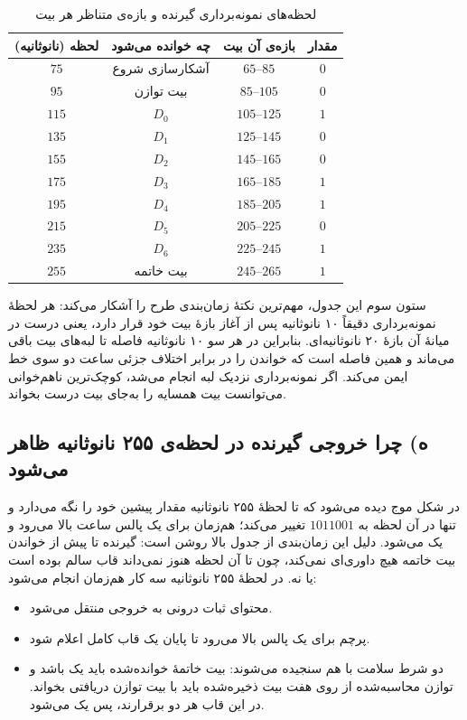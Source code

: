\documentclass[12pt,a4paper]{article}
\begin{document}
	\begin{table}[H]
		\centering
		\footnotesize
		\begin{tabular}{|c|c|c|c|}
			\hline
			\textbf{لحظه (نانوثانیه)} & \textbf{چه خوانده می‌شود} & \textbf{بازه‌ی آن بیت} & \textbf{مقدار} \\ \hline
			\(75\)  & آشکارسازی شروع & \(65\)--\(85\)   & \(0\) \\ \hline
			\(95\)  & بیت توازن      & \(85\)--\(105\)  & \(0\) \\ \hline
			\(115\) & \(D_0\)        & \(105\)--\(125\) & \(1\) \\ \hline
			\(135\) & \(D_1\)        & \(125\)--\(145\) & \(0\) \\ \hline
			\(155\) & \(D_2\)        & \(145\)--\(165\) & \(0\) \\ \hline
			\(175\) & \(D_3\)        & \(165\)--\(185\) & \(1\) \\ \hline
			\(195\) & \(D_4\)        & \(185\)--\(205\) & \(1\) \\ \hline
			\(215\) & \(D_5\)        & \(205\)--\(225\) & \(0\) \\ \hline
			\(235\) & \(D_6\)        & \(225\)--\(245\) & \(1\) \\ \hline
			\(255\) & بیت خاتمه      & \(245\)--\(265\) & \(1\) \\ \hline
		\end{tabular}
		\caption{لحظه‌های نمونه‌برداری گیرنده و بازه‌ی متناظر هر بیت}
	\end{table}

	ستون سوم این جدول، مهم‌ترین نکتهٔ زمان‌بندی طرح را آشکار می‌کند: هر لحظهٔ نمونه‌برداری دقیقاً ۱۰ نانوثانیه پس از آغاز بازهٔ بیت خود قرار دارد، یعنی درست در میانهٔ آن بازهٔ ۲۰ نانوثانیه‌ای. بنابراین در هر سو ۱۰ نانوثانیه فاصله تا لبه‌های بیت باقی می‌ماند و همین فاصله است که خواندن را در برابر اختلاف جزئی ساعت دو سوی خط ایمن می‌کند. اگر نمونه‌برداری نزدیک لبه انجام می‌شد، کوچک‌ترین ناهم‌خوانی می‌توانست بیت همسایه را به‌جای بیت درست بخواند.

	\subsection*{ه) چرا خروجی گیرنده در لحظه‌ی ۲۵۵ نانوثانیه ظاهر می‌شود}
	در شکل موج دیده می‌شود که  تا لحظهٔ ۲۵۵ نانوثانیه مقدار پیشین خود را نگه می‌دارد و تنها در آن لحظه به \(1011001\) تغییر می‌کند؛ هم‌زمان  برای یک پالس ساعت بالا می‌رود و  یک می‌شود. دلیل این زمان‌بندی از جدول بالا روشن است: گیرنده تا پیش از خواندن بیت خاتمه هیچ داوری‌ای نمی‌کند، چون تا آن لحظه هنوز نمی‌داند قاب سالم بوده است یا نه. در لحظهٔ ۲۵۵ نانوثانیه سه کار هم‌زمان انجام می‌شود:
	\begin{itemize}
		\item محتوای ثبات درونی به خروجی  منتقل می‌شود.
		\item پرچم  برای یک پالس بالا می‌رود تا پایان یک قاب کامل اعلام شود.
		\item دو شرط سلامت با هم سنجیده می‌شوند: بیت خاتمهٔ خوانده‌شده باید یک باشد و توازن محاسبه‌شده از روی هفت بیت ذخیره‌شده باید با بیت توازن دریافتی بخواند. در این قاب هر دو برقرارند، پس  یک می‌شود.
	\end{itemize}
\end{document}
